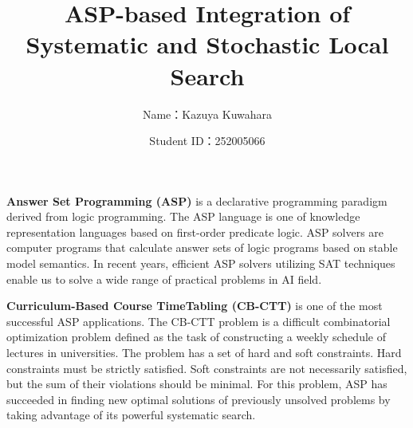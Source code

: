 \documentclass[dvipdfmx,a4paper]{jsarticle}
\title{ASP-based Integration of Systematic and Stochastic Local Search}
\author{Name：Kazuya Kuwahara}
\date{Student ID：252005066}
\begin{document}
\maketitle


\textbf{Answer Set Programming (ASP)} is 
a declarative programming paradigm derived from logic programming. 
The ASP language is one of knowledge representation languages 
based on first-order predicate logic. 
ASP solvers are computer programs that calculate answer sets of logic
programs based on stable model semantics.
In recent years, 
efficient ASP solvers utilizing 
SAT techniques enable us to solve a wide range of
practical problems in AI field.


\textbf{Curriculum-Based Course TimeTabling (CB-CTT)} 
is one of the most successful ASP applications.
The CB-CTT problem is a difficult combinatorial optimization problem
defined as the task of constructing a weekly schedule of lectures in
universities.
The problem has a set of hard and soft constraints.
Hard constraints must be strictly satisfied.
Soft constraints are not necessarily satisfied,
but the sum of their violations should be minimal.
For this problem, 
ASP has succeeded in finding new optimal solutions of previously
unsolved problems by taking advantage of its powerful systematic
search.

\end{document}
